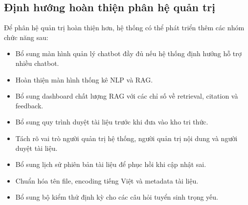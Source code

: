 \subsection{Định hướng hoàn thiện phân hệ quản trị}

Để phân hệ quản trị hoàn thiện hơn, hệ thống có thể phát triển thêm các nhóm chức năng sau:

\begin{itemize}
    \item Bổ sung màn hình quản lý chatbot đầy đủ nếu hệ thống định hướng hỗ trợ nhiều chatbot.
    \item Hoàn thiện màn hình thống kê NLP và RAG.
    \item Bổ sung dashboard chất lượng RAG với các chỉ số về retrieval, citation và feedback.
    \item Bổ sung quy trình duyệt tài liệu trước khi đưa vào kho tri thức.
    \item Tách rõ vai trò người quản trị hệ thống, người quản trị nội dung và người duyệt tài liệu.
    \item Bổ sung lịch sử phiên bản tài liệu để phục hồi khi cập nhật sai.
    \item Chuẩn hóa tên file, encoding tiếng Việt và metadata tài liệu.
    \item Bổ sung bộ kiểm thử định kỳ cho các câu hỏi tuyển sinh trọng yếu.
\end{itemize}
